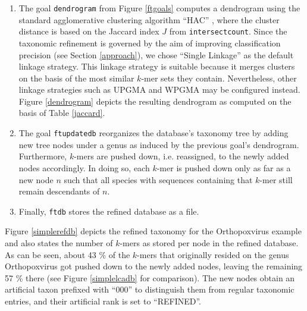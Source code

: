 \documentclass[pdflatex,sn-vancouver-num]{sn-jnl}
\begin{document}
\begin{enumerate}
	\item The goal \verb|dendrogram| from Figure \ref{ftgoals} computes a dendrogram using the standard agglomerative clustering algorithm \enquote{HAC} \cite{King01031967,1394399}, where the cluster distance is based on the Jaccard index $J$ from \verb|intersectcount|. Since the taxonomic refinement is governed by the aim of improving classification precision (see Section \ref{approach}), we chose \enquote{Single Linkage} \cite{King01031967} as the default linkage strategy. This linkage strategy is suitable because it merges clusters on the basis of the most similar $k$-mer sets they contain. Nevertheless, other linkage strategies such as UPGMA and WPGMA \cite{Sokal1958ASM} may be configured instead. Figure \ref{dendrogram} depicts the resulting dendrogram as computed on the basis of Table \ref{jaccard}.

	\item The goal \verb|ftupdatedb| reorganizes the database's taxonomy tree by adding new tree nodes under a genus as induced by the previous goal's dendrogram. Furthermore, $k$-mers are pushed down, i.e. reassigned, to the newly added nodes accordingly. In doing so, each $k$-mer is pushed down only as far as a new node $n$ such that all species with sequences containing that $k$-mer still remain descendants of $n$.

	\item Finally, \verb|ftdb| stores the refined database as a file.
\end{enumerate} 

	Figure \ref{simplerefdb} depicts the refined taxonomy for the Orthopoxvirus example and also states the number of $k$-mers as stored per node in the refined database. As can be seen, about 43 \% of the $k$-mers that originally resided on the genus Orthopoxvirus got pushed down to the newly added nodes, leaving the remaining 57 \% there (see Figure \ref{simplelcadb} for comparison). The new nodes obtain an artificial taxon prefixed with \enquote{000} to distinguish them from regular taxonomic entries, and their artificial rank is set to \enquote{REFINED}.  
\end{document}
